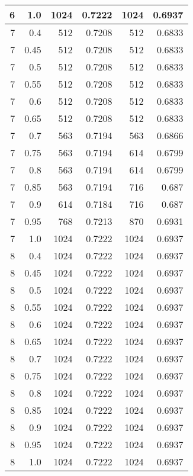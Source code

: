 \begin{center}
\begin{longtable}{|r|r|r|r|r|r|}
\hline
6 & 1.0 & 1024 & 0.7222 & 1024 & 0.6937 \\
\hline
7 & 0.4 & 512 & 0.7208 & 512 & 0.6833 \\
\hline
7 & 0.45 & 512 & 0.7208 & 512 & 0.6833 \\
\hline
7 & 0.5 & 512 & 0.7208 & 512 & 0.6833 \\
\hline
7 & 0.55 & 512 & 0.7208 & 512 & 0.6833 \\
\hline
7 & 0.6 & 512 & 0.7208 & 512 & 0.6833 \\
\hline
7 & 0.65 & 512 & 0.7208 & 512 & 0.6833 \\
\hline
7 & 0.7 & 563 & 0.7194 & 563 & 0.6866 \\
\hline
7 & 0.75 & 563 & 0.7194 & 614 & 0.6799 \\
\hline
7 & 0.8 & 563 & 0.7194 & 614 & 0.6799 \\
\hline
7 & 0.85 & 563 & 0.7194 & 716 & 0.687 \\
\hline
7 & 0.9 & 614 & 0.7184 & 716 & 0.687 \\
\hline
7 & 0.95 & 768 & 0.7213 & 870 & 0.6931 \\
\hline
7 & 1.0 & 1024 & 0.7222 & 1024 & 0.6937 \\
\hline
8 & 0.4 & 1024 & 0.7222 & 1024 & 0.6937 \\
\hline
8 & 0.45 & 1024 & 0.7222 & 1024 & 0.6937 \\
\hline
8 & 0.5 & 1024 & 0.7222 & 1024 & 0.6937 \\
\hline
8 & 0.55 & 1024 & 0.7222 & 1024 & 0.6937 \\
\hline
8 & 0.6 & 1024 & 0.7222 & 1024 & 0.6937 \\
\hline
8 & 0.65 & 1024 & 0.7222 & 1024 & 0.6937 \\
\hline
8 & 0.7 & 1024 & 0.7222 & 1024 & 0.6937 \\
\hline
8 & 0.75 & 1024 & 0.7222 & 1024 & 0.6937 \\
\hline
8 & 0.8 & 1024 & 0.7222 & 1024 & 0.6937 \\
\hline
8 & 0.85 & 1024 & 0.7222 & 1024 & 0.6937 \\
\hline
8 & 0.9 & 1024 & 0.7222 & 1024 & 0.6937 \\
\hline
8 & 0.95 & 1024 & 0.7222 & 1024 & 0.6937 \\
\hline
8 & 1.0 & 1024 & 0.7222 & 1024 & 0.6937 \\
\hline

\end{longtable}
\end{center}
